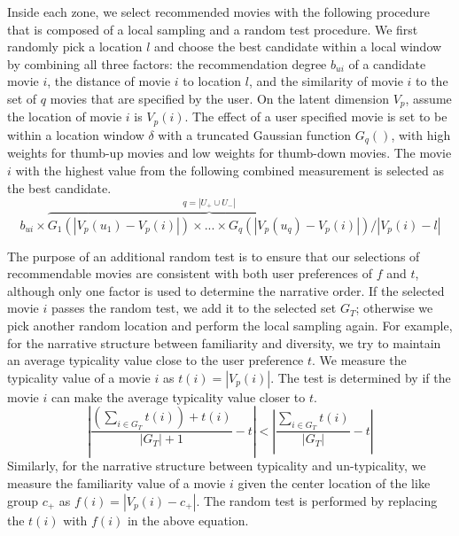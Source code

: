 \documentclass{vgtc}                          %
\begin{document}
Inside each zone, we select recommended movies with the following procedure that is composed of a local sampling and a random test procedure.
We first randomly pick a location $l$ and choose the best candidate within a local window by combining all three factors: the recommendation degree $b_{ui}$ of a candidate movie $i$, the distance of movie $i$ to location $l$, and the similarity of movie $i$ to the set of $q$ movies that are specified by the user.
On the latent dimension $V_p$, assume the location of movie $i$ is $V_p(i)$.
The effect of a user specified movie is set to be within a location window $\delta$ with a truncated Gaussian function $G_q()$, with high weights for thumb-up movies and low weights for thumb-down movies.
The movie $i$ with the highest value from the following combined measurement is selected as the best candidate.
\begin{equation}
b_{ui} \times \overbrace{ G_1(| V_p(u_1) - V_p(i) |) \times ... \times G_q(| V_p(u_q) - V_p(i) |)}^{q = | U_+ \cup U_- |} / | V_p(i)- l |
\end{equation}


The purpose of an additional random test is to ensure that our selections of recommendable movies are consistent with both user preferences of $f$ and $t$, although only one factor is used to determine the narrative order.
If the selected movie $i$ passes the random test, we add it to the selected set $G_T$; otherwise we pick another random location and perform the local sampling again.
For example, for the narrative structure between familiarity and diversity, we try to maintain an average typicality value close to the user preference $t$.
We measure the typicality value of a movie $i$ as $t(i) = | V_p(i) |$.
The test is determined by if the movie $i$ can make the average typicality value closer to $t$.
\begin{equation}
| \frac{(\sum_{i \in G_T}{t(i)}) + t(i)} {| G_T | + 1} - t | < | \frac{\sum_{i \in G_T}{t(i)}} {| G_T |} - t |
\end{equation}
Similarly, for the narrative structure between typicality and un-typicality, we measure the familiarity value of a movie $i$ given the center location of the like group $c_+$ as $f(i) = | V_p(i) - c_+ |$.
The random test is performed by replacing the $t(i)$ with $f(i)$ in the above equation.
\end{document}
